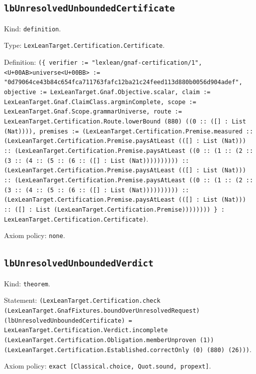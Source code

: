 \documentclass[11pt]{article}
\begin{document}
\subsection*{\texttt{lbUnresolvedUnboundedCertificate}}
\noindent Kind: \texttt{definition}.\par
\noindent Type: \texttt{LexLeanTarget.Certification.Certificate}.\par
\noindent Definition: \texttt{(\{ verifier := "lexlean/gnaf-certification/1", <U+00AB>universe<U+00BB> := "0d79064ce43b84c654fca711763fafc12ba21c24feed113d880b0056d904adef", objective := LexLeanTarget.Gnaf.Objective.scalar, claim := LexLeanTarget.Gnaf.ClaimClass.argminComplete, scope := LexLeanTarget.Gnaf.Scope.grammarUniverse, route := LexLeanTarget.Certification.Route.lowerBound (880) ((0 :: ([] : List (Nat)))), premises := (LexLeanTarget.Certification.Premise.measured :: (LexLeanTarget.Certification.Premise.paysAtLeast (([] : List (Nat))) :: (LexLeanTarget.Certification.Premise.paysAtLeast ((0 :: (1 :: (2 :: (3 :: (4 :: (5 :: (6 :: ([] : List (Nat)))))))))) :: (LexLeanTarget.Certification.Premise.paysAtLeast (([] : List (Nat))) :: (LexLeanTarget.Certification.Premise.paysAtLeast ((0 :: (1 :: (2 :: (3 :: (4 :: (5 :: (6 :: ([] : List (Nat)))))))))) :: (LexLeanTarget.Certification.Premise.paysAtLeast (([] : List (Nat))) :: ([] : List (LexLeanTarget.Certification.Premise)))))))) \} : LexLeanTarget.Certification.Certificate)}.\par
\noindent Axiom policy: \texttt{none}.\par
\subsection*{\texttt{lbUnresolvedUnboundedVerdict}}
\noindent Kind: \texttt{theorem}.\par
\noindent Statement: \texttt{(LexLeanTarget.Certification.check (LexLeanTarget.GnafFixtures.boundOverUnresolvedRequest) (lbUnresolvedUnboundedCertificate) = LexLeanTarget.Certification.Verdict.incomplete (LexLeanTarget.Certification.Obligation.memberUnproven (1)) (LexLeanTarget.Certification.Established.correctOnly (0) (880) (26)))}.\par
\noindent Axiom policy: \texttt{exact [Classical.choice, Quot.sound, propext]}.\par
\end{document}
